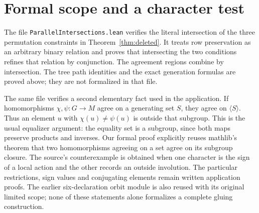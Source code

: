 \documentclass[a4paper,11pt]{article}
\begin{document}
\section{Formal scope and a character test}
The file \texttt{ParallelIntersections.lean} verifies the literal intersection
of the three permutation constraints in Theorem~\ref{thm:deleted}. It treats
row preservation as an arbitrary binary relation and proves that intersecting
the two conditions refines that relation by conjunction. The agreement regions
combine by intersection. The tree path identities and the exact generation
formulas are proved above; they are not formalized in that file.

The same file verifies a second elementary fact used in the application.
If homomorphisms $\chi,\psi:G\to M$ agree on a generating set $S$, they agree
on $\langle S\rangle$. Thus an element $u$ with
$\chi(u)\ne\psi(u)$ is outside that subgroup. This is the usual equalizer
argument: the equality set is a subgroup, since both maps preserve products
and inverses. Our formal proof explicitly reuses mathlib's theorem that two
homomorphisms agreeing on a set agree on its subgroup closure. The source's
counterexample is obtained when one character is the sign of a local action
and the other records an outside involution. The particular restrictions,
sign values and conjugating elements remain written application proofs.
The earlier six-declaration orbit module is also reused with its original
limited scope; none of these statements alone formalizes a complete gluing
construction.
\end{document}
